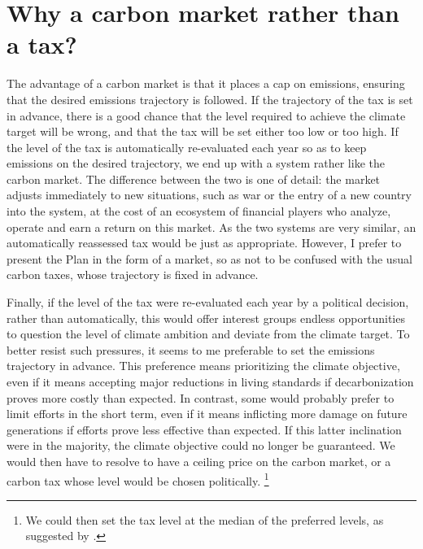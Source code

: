\documentclass[a5paper,english,openany]{memoir}
\begin{document}
\section*{\normalsize Why a carbon market rather than a tax?}\label{q:taxe}
The advantage of a carbon market is that it places a cap on emissions, ensuring that the desired emissions trajectory is followed. If the trajectory of the tax is set in advance, there is %
a good chance that the level required to achieve the climate target will be wrong, and that the tax will be set either too low or too high. If the level of the tax is automatically re-evaluated
each year so as to keep emissions on the desired trajectory, we end up with a system rather like the carbon market. The difference between the two is one of detail: the market adjusts immediately to new situations, such as war or the entry of a new country into the system, %
at the cost of an ecosystem of financial players who analyze, %
operate and earn a return on this market. As the two systems are very similar, an automatically reassessed tax would be just as appropriate. However, I prefer to present the Plan in the form of a market, so as not to be confused with the usual carbon taxes, whose trajectory is fixed in advance. 

Finally, if the level of the tax were re-evaluated each year by a political decision, rather than automatically, %
this would offer interest groups endless opportunities to question the level of climate ambition and deviate from the climate target. To better resist such pressures, it seems to me preferable to set the emissions trajectory in advance. This preference means prioritizing %
the climate objective, even if it means accepting major reductions in living standards if decarbonization %
proves more costly than expected. 
In contrast, %
some would probably prefer to limit efforts in the short term, even if it means inflicting more damage on future generations if efforts prove less effective than expected. If this latter inclination were in the majority, the climate objective could no longer be guaranteed. We would then have to resolve to have a ceiling price on the carbon market, or a carbon tax whose level would be chosen politically. \footnote{We could then set the tax level at the median of the preferred levels, as suggested by \cite{weitzman_world_2017}.}
\end{document}

